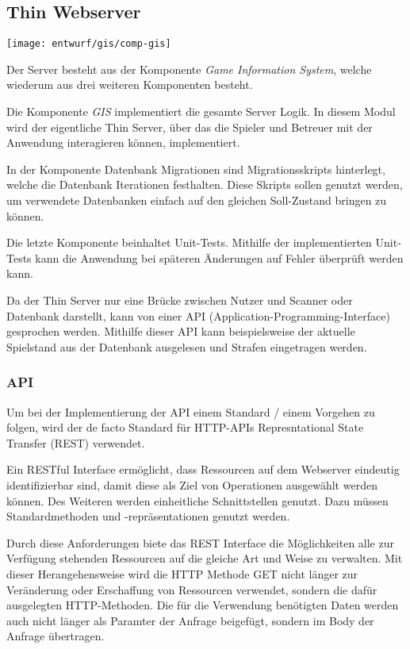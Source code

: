 \subsection{Thin Webserver}
\begin{center}
	\texttt{[image: entwurf/gis/comp-gis]}
\end{center}

Der Server besteht aus der Komponente \textit{Game Information System}, welche wiederum aus drei weiteren Komponenten besteht. 

Die Komponente \textit{GIS} implementiert die gesamte Server Logik. In diesem Modul wird der eigentliche Thin Server, über das die Spieler und Betreuer mit der Anwendung interagieren können, implementiert.

In der Komponente Datenbank Migrationen sind Migrationsskripts hinterlegt, welche die Datenbank Iterationen festhalten. Diese Skripts sollen genutzt werden, um verwendete Datenbanken einfach auf den gleichen Soll-Zustand bringen zu können. 

Die letzte Komponente beinhaltet Unit-Tests. Mithilfe der implementierten Unit-Tests kann die Anwendung bei späteren Änderungen auf Fehler überprüft werden kann.


Da der Thin Server nur eine Brücke zwischen Nutzer und Scanner oder Datenbank darstellt, kann von einer API (Application-Programming-Interface) gesprochen werden. Mithilfe dieser API kann beispielsweise der aktuelle Spielstand aus der Datenbank ausgelesen und Strafen eingetragen werden.

\subsubsection{API}
Um bei der Implementierung der API einem Standard / einem Vorgehen zu folgen, wird der de facto Standard für HTTP-APIs Represntational State Transfer (REST) verwendet.

Ein RESTful Interface ermöglicht, dass Ressourcen auf dem Webserver eindeutig identifizierbar sind, damit diese als Ziel von Operationen ausgewählt werden können. Des Weiteren werden einheitliche Schnittstellen genutzt. Dazu müssen Standardmethoden und -repräsentationen genutzt werden.

Durch diese Anforderungen biete das REST Interface die Möglichkeiten alle zur Verfügung stehenden Ressourcen auf die gleiche Art und Weise zu verwalten. Mit dieser Herangehensweise wird die HTTP Methode GET nicht länger zur Veränderung oder Erschaffung von Ressourcen verwendet, sondern die dafür ausgelegten HTTP-Methoden. Die für die Verwendung benötigten Daten werden auch nicht länger als Paramter der Anfrage beigefügt, sondern im Body der Anfrage übertragen.\cite{beimsWebApplikationenREST2014}


